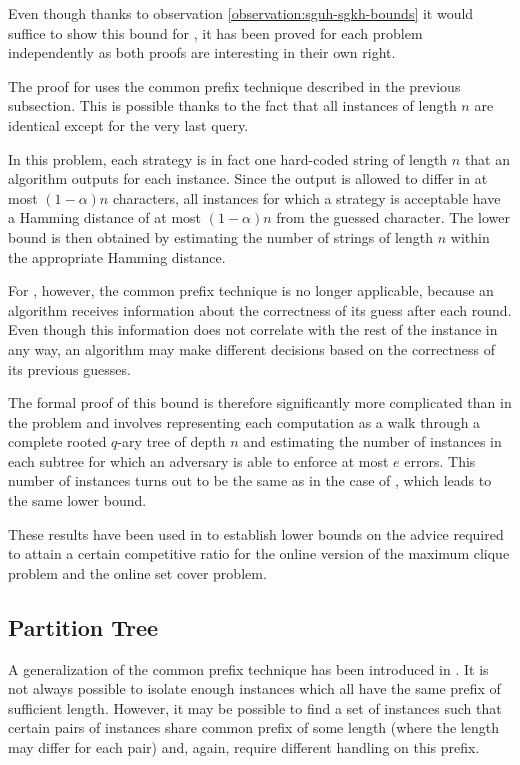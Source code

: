Even though thanks to observation \ref{observation:sguh-sgkh-bounds} it
would suffice to show this bound for , it has been proved for each
problem independently as both proofs are interesting in their own right.

The proof for  uses the common prefix technique described in the
previous subsection. This is possible thanks to the fact that all
instances of length $n$ are identical except for the very last query.

In this problem, each strategy is in fact one hard-coded string of length
$n$ that an algorithm outputs for each instance. Since the output is
allowed to differ in at most $(1-\alpha)n$ characters, all instances for
which a strategy is acceptable have a Hamming distance of at most
$(1-\alpha)n$ from the guessed character. The lower bound is then obtained
by estimating the number of strings of length $n$ within the appropriate
Hamming distance.

For , however, the common prefix technique is no longer
applicable, because an algorithm receives information about the
correctness of its guess after each round. Even though this information
does not correlate with the rest of the instance in any way, an algorithm
may make different decisions based on the correctness of its previous
guesses.

The formal proof of this bound is therefore significantly more complicated
than in the  problem and involves representing each computation as
a walk through a complete rooted $q$-ary tree of depth $n$ and estimating
the number of instances in each subtree for which an adversary is able to
enforce at most $e$ errors. This number of instances turns out to be the
same as in the case of , which leads to the same lower bound.

These results have been used in \cite{string-guessing} to establish lower
bounds on the advice required to attain a certain competitive ratio for
the online version of the maximum clique problem and the online set cover
problem.

\subsection{Partition Tree}

A generalization of the common prefix technique has been introduced in
\cite{sofsem2014}. It is not always possible to isolate enough instances
which all have the same prefix of sufficient length. However, it may be
possible to find a set of instances such that certain pairs of instances
share common prefix of some length (where the length may differ for each
pair) and, again, require different handling on this prefix.

